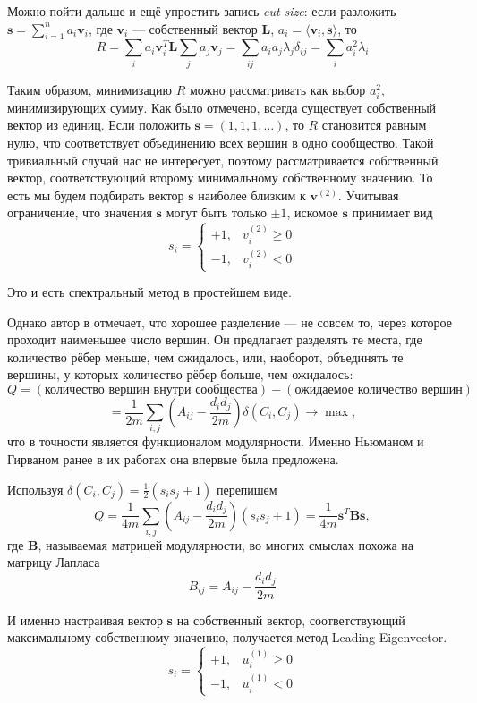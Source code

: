\documentclass[12pt]{article}
\begin{document}
Можно пойти дальше и ещё упростить запись \textit{cut size}: если разложить $\textbf{s} = \sum_{i=1}^na_i\textbf{v}_i$, где $\textbf{v}_i$ --- собственный вектор $\textbf{L}$, $a_i = \langle\textbf{v}_i, \textbf{s}\rangle$, то 
\[
R = \sum\limits_ia_i\textbf{v}^T_i\textbf{L}\sum\limits_ja_j\textbf{v}_j = \sum\limits_{ij}a_ia_j\lambda_j\delta_{ij} = \sum\limits_ia_i^2\lambda_i
\]

Таким образом, минимизацию $R$ можно рассматривать как выбор $a_i^2$, минимизирующих сумму. Как было отмечено, всегда существует собственный вектор из единиц. Если положить $\textbf{s} = (1, 1, 1, \dots)$, то $R$ становится равным нулю, что соответствует объединению всех вершин в одно сообщество. Такой тривиальный случай нас не интересует, поэтому рассматривается собственный вектор, соответствующий второму минимальному собственному значению. То есть мы будем подбирать вектор $\textbf{s}$ наиболее близким к $\textbf{v}^{(2)}$. Учитывая ограничение, что значения $\textbf{s}$ могут быть только $\pm1$, искомое $\textbf{s}$ принимает вид
\[
s_i = 
\begin{cases}
+1, & v^{(2)}_i \geq 0 \\
-1, & v^{(2)}_i < 0
\end{cases}
\]

Это и есть спектральный метод в простейшем виде.

Однако автор в \cite{leading_eigenvector} отмечает, что хорошее разделение --- не совсем то, через которое проходит наименьшее число вершин. Он предлагает разделять те места, где количество рёбер меньше, чем ожидалось, или, наоборот, объединять те вершины, у которых количество рёбер больше, чем ожидалось:
\[
Q = (\text{количество вершин внутри сообщества}) - (\text{ожидаемое количество вершин})
\]
\[ = \frac{1}{2m}\sum_{i,j}\left(A_{ij}-\frac{d_i d_j}{2m}\right)\delta(C_i, C_j) \to \max,
\]
что в точности является функционалом модулярности. Именно Ньюманом и Гирваном ранее в их работах она впервые была предложена.

Используя $\delta(C_i, C_j) = \tfrac{1}{2}(s_is_j+1)$ перепишем
\[
Q = \frac{1}{4m}\sum_{i,j}\left(A_{ij}-\frac{d_i d_j}{2m}\right)(s_is_j+1) = \frac{1}{4m}\textbf{s}^T\textbf{Bs},
\]
где \textbf{B}, называемая матрицей модулярности, во многих смыслах похожа на матрицу Лапласа
\[
B_{ij} = A_{ij} - \frac{d_i d_j}{2m}
\]

И именно настраивая вектор \textbf{s} на собственный вектор, соответствующий максимальному собственному значению, получается метод Leading Eigenvector.
\[
s_i = 
\begin{cases}
+1, & u^{(1)}_i \geq 0 \\
-1, & u^{(1)}_i < 0
\end{cases}
\]
\end{document}
